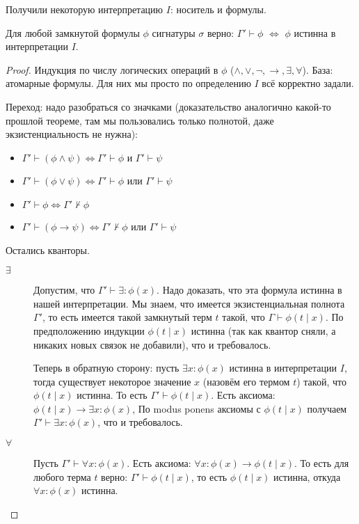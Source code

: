 		Получили некоторую интерпретацию $I$: носитель и формулы.
		\begin{assertion}
			Для любой замкнутой формулы $\phi$ сигнатуры $\sigma$ верно:
			$\Gamma' \vdash \phi$ $\iff$ $\phi$ истинна в интерпретации $I$.
		\end{assertion}
		\begin{proof}
			Индукция по числу логических операций в $\phi$ ($\land, \lor, \lnot, \to, \exists, \forall$).
			База: атомарные формулы. Для них мы просто по определению $I$ всё корректно задали.

			Переход: надо разобраться со значками (доказательство аналогично какой-то прошлой теореме,
  			там мы пользовались только полнотой, даже экзистенциальность не нужна):
  			\begin{itemize}
   				\item $\Gamma' \vdash (\phi \land \psi) \iff \Gamma' \vdash \phi$ и $\Gamma' \vdash\psi$
   				\item $\Gamma' \vdash (\phi \lor \psi) \iff \Gamma' \vdash \phi$ или $\Gamma' \vdash\psi$
   				\item $\Gamma' \vdash \phi \iff \Gamma' \not\vdash \phi$
   				\item $\Gamma' \vdash (\phi \to \psi) \iff \Gamma' \not\vdash \phi$ или $\Gamma' \vdash \psi$
  			\end{itemize}

			Остались кванторы.
  			\begin{description}
  			\item[$\exists$]
   			Допустим, что $\Gamma' \vdash \exists \colon \phi(x)$.
			Надо доказать, что эта формула истинна в нашей интерпретации.
				Мы знаем, что имеется экзистенциальная полнота $\Gamma'$, то есть
				имеется такой замкнутый терм $t$ такой, что $\Gamma \vdash \phi(t \mid x)$.
				По предположению индукции $\phi(t \mid x)$ истинна (так как квантор сняли,
				а никаких новых связок не добавили), что и требовалось.

				Теперь в обратную сторону: пусть $\exists x \colon \phi(x)$ истинна в интерпретации
				$I$, тогда существует некоторое значение $x$ (назовём его термом $t$) такой, что
				$\phi(t \mid x)$ истинна.
				То есть $\Gamma' \vdash \phi(t \mid x)$.
				Есть аксиома: $\phi(t\mid x) \to \exists x \colon \phi(x)$,
				По modus ponens аксиомы с $\phi(t\mid x)$ получаем $\Gamma' \vdash \exists x \colon \phi(x)$,
				что и требовалось.

			\item[$\forall$]
				Пусть $\Gamma' \vdash \forall x \colon \phi(x)$.
				Есть аксиома: $\forall x \colon \phi(x) \to \phi(t \mid x)$.
				То есть для любого терма $t$ верно: $\Gamma' \vdash \phi(t \mid x)$,
				то есть $\phi(t\mid x)$ истинна, откуда $\forall x \colon \phi(x)$ истинна.


\end{description}
\end{proof}
